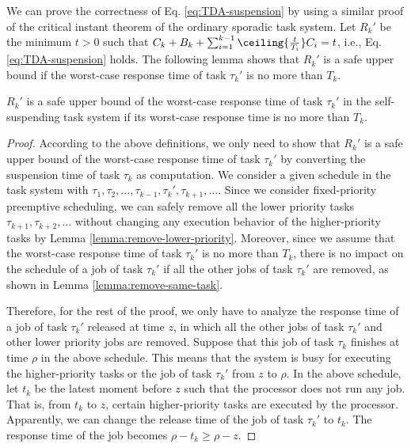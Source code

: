 We can prove the correctness of Eq. \eqref{eq:TDA-suspension} by using a similar proof of the critical instant theorem of the ordinary sporadic task system.
Let $R_k'$ be the minimum $t > 0$ such that  $C_k + B_k + \sum_{i=1}^{k-1}\ceiling{\frac{t}{T_i}} C_i = t$, i.e., Eq. \ref{eq:TDA-suspension} holds. The following lemma shows that $R_k'$ is a safe upper bound if the worst-case response time of task $\tau_k'$ is no more than $T_k$.

\begin{lemma}
\label{lemma:critical}
 $R_k'$ is a safe upper bound of the worst-case response time of task $\tau_k'$ in the self-suspending task system if its worst-case response time is no more than $T_k$.
\end{lemma}
\begin{proof}
According to the above definitions, we only need to show that $R_k'$ is a safe upper bound of the worst-case response time of task $\tau_k'$ by converting the suspension time of task $\tau_k$ as computation. We consider a given schedule in the task system with $\tau_1, \tau_2, \ldots, \tau_{k-1}, \tau_k', \tau_{k+1}, \ldots$. Since we consider fixed-priority preemptive scheduling, we can safely remove all the lower priority tasks $\tau_{k+1}, \tau_{k+2}, \ldots$ without changing any execution behavior of the higher-priority tasks by Lemma \ref{lemma:remove-lower-priority}. Moreover, since we assume that the worst-case response time of task $\tau_k'$ is no more than $T_k$, there is no impact on the schedule of a job of task $\tau_k'$ if all the other jobs of task $\tau_k'$ are removed, as shown in Lemma \ref{lemma:remove-same-task}. 


Therefore, for the rest of the proof, we only have to analyze the response time of a job of task $\tau_k'$ released at time $z$, in which all the other jobs of task $\tau_k'$ and other lower priority jobs are removed. Suppose that this job of task $\tau_k$ finishes at time $\rho$ in the above schedule. This means that the system is busy for executing the higher-priority tasks or the job of task $\tau_k'$ from $z$ to $\rho$. In the above schedule, let $t_{k}$ be the latest moment before $z$ such that the processor does not run any job. That is, from $t_k$ to $z$, certain higher-priority tasks are executed by the processor. Apparently, we can change the release time of the job of task $\tau_k'$ to $t_k$. The response time of the job becomes $\rho-t_k \geq \rho-z$. 


\end{proof}
